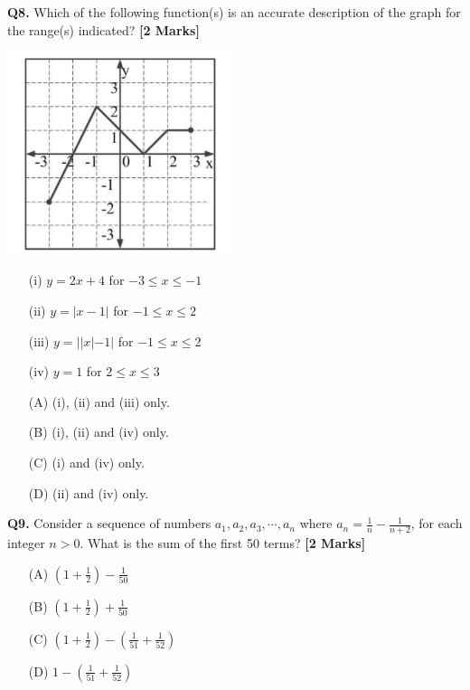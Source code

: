 \documentclass[11pt]{article}
\newcommand{\questionb}[2]{
    \noindent\textbf{Q#2.} #1 \hfill \textbf{[2 Marks]}
}
\begin{document}
\questionb{Which of the following function(s) is an accurate description of the graph for the range(s) indicated?}{8}

\begin{center}
\includegraphics[width=0.5\textwidth]{figures/Q8.png}
\end{center}
\begin{enumerate}
    \item[(i)] \( y = 2x + 4 \) for \(-3 \leq x \leq -1\)
    \item[(ii)] \( y = |x - 1| \) for \(-1 \leq x \leq 2\)
    \item[(iii)] \( y = ||x| - 1| \) for \(-1 \leq x \leq 2\)
    \item[(iv)] \( y = 1 \) for \( 2 \leq x \leq 3 \)
\end{enumerate}

\begin{enumerate}
    \item[(A)] (i), (ii) and (iii) only.
    \item[(B)] (i), (ii) and (iv) only.
    \item[(C)] (i) and (iv) only.
    \item[(D)] (ii) and (iv) only.
\end{enumerate}
\vspace{0.5cm}

\questionb{Consider a sequence of numbers \( a_1, a_2, a_3, \cdots, a_n \) where \( a_n = \frac{1}{n} - \frac{1}{n+2} \), for each integer \( n > 0 \). What is the sum of the first 50 terms?}{9}
\begin{enumerate}
    \item[(A)] \( \left( 1 + \frac{1}{2} \right) - \frac{1}{50} \)
    \item[(B)] \( \left( 1 + \frac{1}{2} \right) + \frac{1}{50} \)
    \item[(C)] \( \left( 1 + \frac{1}{2} \right) - \left( \frac{1}{51} + \frac{1}{52} \right) \)
    \item[(D)] \( 1 - \left( \frac{1}{51} + \frac{1}{52} \right) \)
\end{enumerate}
\vspace{0.5cm}
\end{document}
